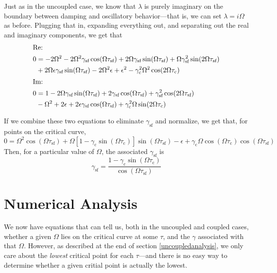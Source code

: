 \documentclass{article}
\newcommand{\self}{{\text{sf}}}
\newcommand{\cpl}{\text{c}}
\begin{document}
    Just as in the uncoupled case, we know that $\lambda$ is purely imaginary on the boundary between damping and oscillatory behavior---that is, we can set $\lambda = i\Omega$ as before. Plugging that in, expanding everything out, and separating out the real and imaginary components, we get that
    \begin{align*}
        \intertext{Re:}
        0 &= -2\Omega^2 - 2 \Omega^2 \gamma_\self \cos(\Omega \tau_\self) + 2\Omega \gamma_\self \sin(\Omega \tau_\self) + \Omega\gamma_\self^2 \sin(2\Omega \tau_\self) \\&+ 2\Omega\epsilon\gamma_\self\sin(\Omega\tau_\self)-2\Omega^2\epsilon + \epsilon^2 - \gamma_\cpl^2\Omega^2\cos(2\Omega\tau_\cpl) \\
        \intertext{Im:}
        0 &= 1 - 2\Omega \gamma_\self \sin(\Omega\tau_\self) + 2\gamma_\self\cos(\Omega \tau_\self)
        + \gamma_\self^2\cos(2\Omega\tau_\self) \\&- \Omega^2 + 2\epsilon + 2\epsilon\gamma_\self\cos(\Omega\tau_\self) + \gamma_\cpl^2\Omega\sin(2\Omega\tau_\cpl)
    \end{align*}

    If we combine these two equations to eliminate $\gamma_\self$ and normalize, we get that, for points on the critical curve,
    \begin{equation}\label{taucpleq}
        0 = \Omega^2\cos(\Omega \tau_\self) + \Omega \left[1-\gamma_\cpl\sin(\Omega\tau_\cpl)\right]\sin(\Omega\tau_\self) - \epsilon + \gamma_\cpl \Omega \cos(\Omega\tau_\cpl)\cos(\Omega\tau_\self)
    \end{equation}
    Then, for a particular value of $\Omega$, the associated $\gamma_\self$ is
    \begin{equation}\label{gammacpleq}
        \gamma_\self = \frac{1-\gamma_\cpl\sin(\Omega \tau_\cpl)}{\cos(\Omega \tau_\self)}
    \end{equation}

    \section{Numerical Analysis}
    We now have equations that can tell us, both in the uncoupled and coupled cases, whether a given $\Omega$ lies on the critical curve at some $\tau$, and the $\gamma$ associated with that $\Omega$. However, as described at the end of section \ref{uncoupledanalysis}, we only care about the \emph{lowest} critical point for each $\tau$---and there is no easy way to determine whether a given critial point is actually the lowest.
\end{document}
